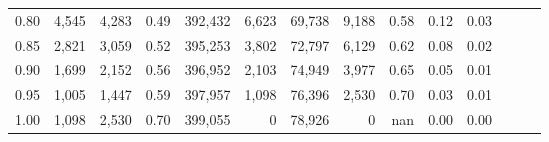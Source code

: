 \begin{tabular}{rrrrrrrrrrrrrr}
0.80 &   4,545 &  4,283 &  0.49 &  392,432 &    6,623 &  69,738 &   9,188 &  0.58 &  0.12 &      0.03 \\
0.85 &   2,821 &  3,059 &  0.52 &  395,253 &    3,802 &  72,797 &   6,129 &  0.62 &  0.08 &      0.02 \\
0.90 &   1,699 &  2,152 &  0.56 &  396,952 &    2,103 &  74,949 &   3,977 &  0.65 &  0.05 &      0.01 \\
0.95 &   1,005 &  1,447 &  0.59 &  397,957 &    1,098 &  76,396 &   2,530 &  0.70 &  0.03 &      0.01 \\
1.00 &   1,098 &  2,530 &  0.70 &  399,055 &        0 &  78,926 &       0 &   nan &  0.00 &      0.00 \\
\bottomrule
\end{tabular}
